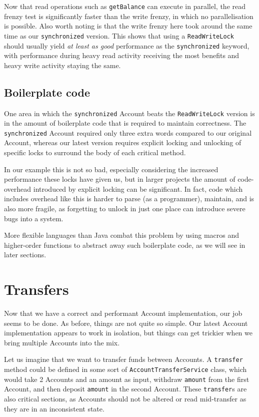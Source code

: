 \documentclass[a4paper,12pt]{kth-mag}
\begin{document}
Now that read operations such as \texttt{getBalance} can execute in parallel, the read frenzy test is significantly faster than the write frenzy, in which no parallelisation is possible. Also worth noting is that the write frenzy here took around the same time as our \texttt{synchronized} version. This shows that using a \texttt{ReadWriteLock} should usually yield \textit{at least as good} performance as the \texttt{synchronized} keyword, with performance during heavy read activity receiving the most benefits and heavy write activity staying the same.

\subsection{Boilerplate code}

One area in which the \texttt{synchronized} Account beats the \texttt{ReadWriteLock} version is in the amount of boilerplate code that is required to maintain correctness. The \texttt{synchronized} Account required only three extra words compared to our original Account, whereas our latest version requires explicit locking and unlocking of specific locks to surround the body of each critical method. 

In our example this is not so bad, especially considering the increased performance these locks have given us, but in larger projects the amount of code-overhead introduced by explicit locking can be significant. In fact, code which includes overhead like this is harder to parse (as a programmer), maintain, and is also more fragile, as forgetting to unlock in just one place can introduce severe bugs into a system.

More flexible languages than Java combat this problem by using macros and higher-order functions to abstract away such boilerplate code, as we will see in later sections.

\section{Transfers}

Now that we have a correct and performant Account implementation, our job seems to be done. As before, things are not quite so simple. Our latest Account implementation appears to work in isolation, but things can get trickier when we bring multiple Accounts into the mix.

Let us imagine that we want to transfer funds between Accounts. A \texttt{transfer} method could be defined in some sort of \texttt{AccountTransferService} class, which would take 2 Accounts and an amount as input, withdraw \texttt{amount} from the first Account, and then deposit \texttt{amount} in the second Account. These \texttt{transfer}s are also critical sections, as Accounts should not be altered or read mid-transfer as they are in an inconsistent state.
\end{document}
